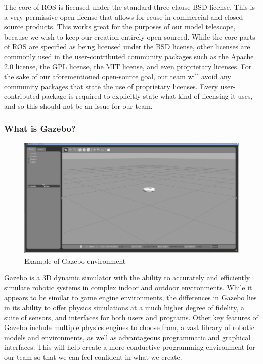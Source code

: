 \documentclass[12pt]{report}
\begin{document}
The core of ROS is licensed under the standard three-clause BSD license. This is a very permissive open license that allows for reuse in commercial and closed source products. This works great for the purposes of our model telescope, because we wish to keep our creation entirely open-sourced. While the core parts of ROS are specified as being licensed under the BSD license, other licenses are commonly used in the user-contributed community packages such as the Apache 2.0 license, the GPL license, the MIT license, and even proprietary licenses. For the sake of our aforementioned open-source goal, our team will avoid any community packages that state the use of proprietary licenses. Every user-contributed package is required to explicitly state what kind of licensing it uses, and so this should not be an issue for our team.

\subsubsection*{What is Gazebo?}

\begin{figure}[h]
	\centering
	\includegraphics[width=0.98\linewidth]{gazebo}
	\caption{Example of Gazebo environment}
\end{figure}

Gazebo is a 3D dynamic simulator with the ability to accurately and efficiently simulate robotic systems in complex indoor and outdoor environments. While it appears to be similar to game engine environments, the differences in Gazebo lies in its ability to offer physics simulations at a much higher degree of fidelity, a suite of sensors, and interfaces for both users and programs.\cite{GazeboDescription} Other key features of Gazebo include multiple physics engines to choose from, a vast library of robotic models and environments, as well as advantageous programmatic and graphical interfaces. This will help create a more conductive programming environment for our team so that we can feel confident in what we create.
\end{document}
